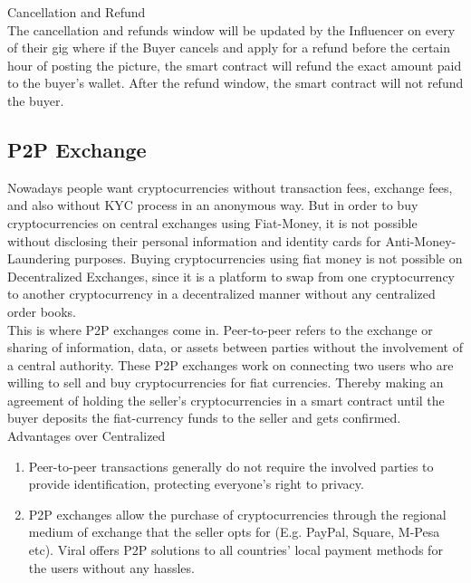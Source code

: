 \documentclass[10pt]{article}
\begin{document}
Cancellation and Refund\\


The cancellation and refunds window will be updated by the Influencer on every of their gig where if the Buyer cancels and apply for a refund before the certain hour of posting the picture, the smart contract will refund the exact amount paid to the buyer’s wallet. After the refund window, the smart contract will not refund the buyer. \\


\subsection{P2P Exchange}

Nowadays people want cryptocurrencies without transaction fees, exchange fees, and also without KYC process in an anonymous way. But in order to buy cryptocurrencies on central exchanges using Fiat-Money, it is not possible without disclosing their personal information and identity cards for Anti-Money-Laundering purposes. Buying cryptocurrencies using fiat money is not possible on Decentralized Exchanges, since it is a platform to swap from one cryptocurrency to another cryptocurrency in a decentralized manner without any centralized order books.\\


This is where P2P exchanges come in. Peer-to-peer refers to the exchange or sharing of information, data, or assets between parties without the involvement of a central authority. These P2P exchanges work on connecting two users who are willing to sell and buy cryptocurrencies for fiat currencies. Thereby making an agreement of holding the seller's cryptocurrencies in a smart contract until the buyer deposits the fiat-currency funds to the seller and gets confirmed.\\


Advantages over Centralized
\begin{enumerate}[leftmargin=+0.2in]
\item Peer-to-peer transactions generally do not require the involved parties to provide identification,  protecting everyone's right to privacy. 
\item P2P exchanges allow the purchase of cryptocurrencies through the regional medium of exchange that the seller opts for (E.g. PayPal, Square, M-Pesa  etc). Viral offers P2P solutions to all countries' local payment methods for the users without any hassles.
\end{enumerate}
\end{document}
